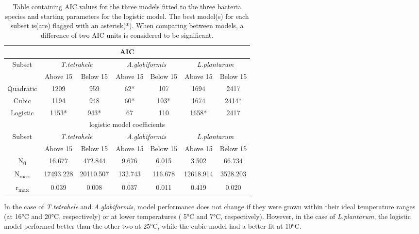\documentclass[a4paper]{article}
\begin{document}
\begin{table}[H]
\caption{Table containing AIC values for the three models fitted to the three bacteria species and starting parameters for the logistic model. The best model(s) for each subset is(are) flagged with an asterisk(*). When comparing between models, a difference of two AIC units is considered to be significant.}
\centering
    \begin{tabular}{c|c|c||c|c||c|c}
    \hline
    \hline
    \multicolumn{7}{c}{AIC}\\
    \hline
    \multirow{2}{*}{Subset}&
    \multicolumn{2}{c||}{\textit{T.tetrahele}} &
    \multicolumn{2}{c||}{\textit{A.globiformis}} &
    \multicolumn{2}{c}{\textit{L.plantarum}}\\ 
    & Above 15 & Below 15 & Above 15 & Below 15 & Above 15 & Below 15 \\
    \hline
    Quadratic & 1209 & 959 & 62* &107 & 1694 & 2417 \\
    Cubic & 1194 & 948 & 60* & 103* & 1674 & 2414* \\
    Logistic & 1153* & 943* & 67 & 110 & 1658* & 2417\\
    \hline
    \hline
    \multicolumn{7}{c}{logistic model coefficients}\\
    \hline
    \multirow{2}{*}{Subset}&
    \multicolumn{2}{c||}{\textit{T.tetrahele}} &
    \multicolumn{2}{c||}{\textit{A.globiformis}} &
    \multicolumn{2}{c}{\textit{L.plantarum}}\\ 
    & Above 15 & Below 15 & Above 15 & Below 15 & Above 15 & Below 15 \\
    \hline
    N\textsubscript{0} & 16.677 & 472.844 & 9.676 & 6.015 & 3.502 & 66.734 \\
    N\textsubscript{max} & 17493.228 & 20110.507 & 132.743 & 116.678 & 12618.914 & 3528.203 \\
    r\textsubscript{max} & 0.039 & 0.008 & 0.037 & 0.011 & 0.419 & 0.020\\
    \hline\hline
    \end{tabular}
\label{tab:hresult}
\end{table}
In the case of \textit{T.tetrahele} and \textit{A.globiformis}, model performance does not change if they were grown within their ideal temperature ranges (at 16°C and 20°C, respectively) or at lower temperatures ( 5°C and 7°C, respectively). However, in the case of \textit{L.plantarum}, the logistic model performed better than the other two at 25°C, while the cubic model had a better fit at 10°C. 
\end{document}
